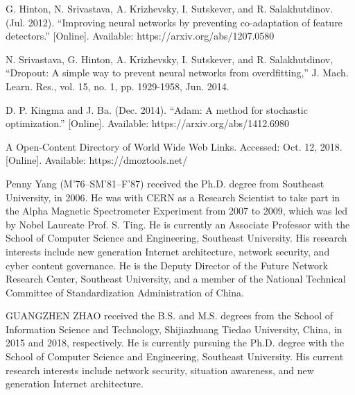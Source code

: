 \documentclass{ieeeaccess}
\begin{document}
\begin{thebibliography}{00}
 G. Hinton, N. Srivastava, A. Krizhevsky, I. Sutskever, and
R. Salakhutdinov. (Jul. 2012). ``Improving neural networks by
preventing co-adaptation of feature detectors.'' [Online]. Available:
https://arxiv.org/abs/1207.0580

 N. Srivastava, G. Hinton, A. Krizhevsky, I. Sutskever, and
R. Salakhutdinov, ``Dropout: A simple way to prevent neural networks
from overdfitting,'' J. Mach. Learn. Res., vol. 15, no. 1, pp. 1929-1958,
Jun. 2014.

 D. P. Kingma and J. Ba. (Dec. 2014). ``Adam: A method for stochastic
optimization.'' [Online]. Available: https://arxiv.org/abs/1412.6980

 A Open-Content Directory of World Wide Web Links. Accessed:
Oct. 12, 2018. [Online]. Available: https://dmoztools.net/
\end{thebibliography}

\begin{IEEEbiography}{Penny Yang} (M'76--SM'81--F'87) received the Ph.D. degree from Southeast University, in 2006. He was with CERN as a Research 
Scientist to take part in the Alpha Magnetic Spectrometer Experiment from 2007 to 2009, which was led by Nobel Laureate Prof. S. Ting. 
He is currently an Associate Professor with the School of Computer Science and Engineering, Southeast University. His research interests include new generation Internet architecture, network security, and cyber content governance. He is the Deputy Director of the Future Network Research Center, Southeast University, and a member of the National Technical Committee of
Standardization Administration of China.
\end{IEEEbiography}

\begin{IEEEbiography}{GUANGZHEN ZHAO} received the B.S. and M.S. degrees from the School of Information Science and Technology, Shijiazhuang Tiedao University, China, in 2015 and 2018, respectively. He is currently pursuing the Ph.D. degree with the School of Computer Science and Engineering, Southeast University. His current research interests include network security, situation awareness, and new
generation Internet architecture.
\end{IEEEbiography}
\end{document}

